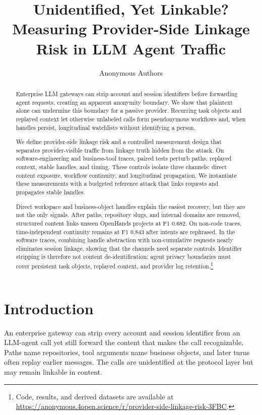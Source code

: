 \documentclass[letterpaper]{article}
\title{Unidentified, Yet Linkable?\\
Measuring Provider-Side Linkage Risk in LLM Agent Traffic}
\author{Anonymous Authors}
\newcommand{\artifactfootnote}{\footnote{Code, results, and derived datasets are available at
\url{https://anonymous.4open.science/r/provider-side-linkage-risk-3FBC}.}}
\begin{document}
\maketitle

\begin{abstract}
Enterprise LLM gateways can strip account and session identifiers before forwarding agent requests,
creating an apparent anonymity boundary. We show that plaintext alone can undermine this boundary
for a passive provider. Recurring task objects and replayed context let otherwise unlabeled calls form
pseudonymous workflows and, when handles persist, longitudinal watchlists without identifying a person.

We define provider-side linkage risk and a controlled measurement design that separates
provider-visible traffic from linkage truth hidden from the attack. On software-engineering and
business-tool traces, paired tests perturb paths, replayed context, stable handles, and timing. These
controls isolate three channels: direct content exposure, workflow continuity, and longitudinal
propagation. We instantiate these measurements with a budgeted reference attack that links requests
and propagates stable handles.

Direct workspace and business-object handles explain the easiest recovery, but they are not the only
signals. After paths, repository slugs, and internal domains are removed, structured content links
unseen OpenHands projects at F1 0.682. On non-code traces, time-independent continuity remains at F1
0.843 after intents are rephrased. In the software traces, combining handle abstraction with non-cumulative
requests nearly eliminates session linkage, showing that the channels need separate controls.
Identifier stripping is therefore not content de-identification: agent privacy boundaries must cover
persistent task objects, replayed context, and provider log retention.\artifactfootnote
\end{abstract}


\section{Introduction}

An enterprise gateway can strip every account and session identifier from an LLM-agent call yet
still forward the content that makes the call recognizable. Paths name repositories, tool arguments
name business objects, and later turns often replay earlier messages. The calls are unidentified at
the protocol layer but may remain linkable in content.
\end{document}
